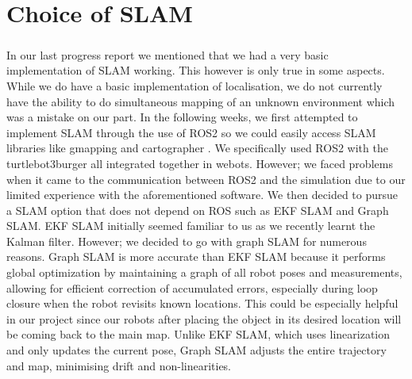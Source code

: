 \chapter{Choice of SLAM}

\paragraph*{}
In our last progress report we mentioned that we had a very basic implementation of SLAM working. This however is only true in some aspects. While we do have a basic implementation of localisation, we do not currently have the ability to do simultaneous mapping of an unknown environment which was a mistake on our part. In the following weeks, we first attempted to implement SLAM through the use of ROS2 so we could easily access SLAM libraries like gmapping and cartographer . We specifically used ROS2 with the turtlebot3burger all integrated together in webots. However; we faced problems when it came to the communication between ROS2 and the simulation due to our limited experience with the aforementioned software. We then decided to pursue a SLAM option that does not depend on ROS such as EKF SLAM and Graph SLAM. EKF SLAM initially seemed familiar to us as we recently learnt the Kalman filter. However; we decided to go with graph SLAM for numerous reasons. Graph SLAM is more accurate than EKF SLAM because it performs global optimization by maintaining a graph of all robot poses and measurements, allowing for efficient correction of accumulated errors, especially during loop closure when the robot revisits known locations. This could be especially helpful in our project since our robots after placing the object in its desired location will be coming back to the main map. Unlike EKF SLAM, which uses linearization and only updates the current pose, Graph SLAM adjusts the entire trajectory and map, minimising drift and non-linearities. 